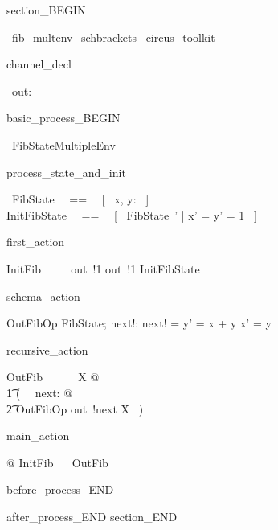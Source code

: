 section_BEGIN
\begin{zsection}
  \SECTION\ fib\_multenv\_schbrackets \parents\ circus\_toolkit
\end{zsection}
channel_decl
\begin{circus}
    \circchannel\ out: \nat
\end{circus}
basic_process_BEGIN
\begin{circus}
    \circprocess\ FibStateMultipleEnv ~~\circdef~~ \circbegin
\end{circus}
process_state_and_init
\begin{circusaction}
    \circstate\ FibState ~~==~~ [~ x, y: \nat ~]  \land [ z: \nat ]\\
    InitFibState ~~==~~ [~ FibState~' | x' = y' = 1 ~]
\end{circusaction}
first_action
\begin{circusaction}
    InitFib ~~\circdef~~ out~!1 \then out~!1 \then \lschexpract InitFibState \rschexpract
\end{circusaction}
schema_action
\begin{schema}{OutFibOp}
    \Delta FibState; next!: \nat
\where
    next! = y' = x + y \land x' = y
\end{schema}
recursive_action
\begin{circusaction}
    OutFib ~~\circdef~~ \circmu\ X @ \\
    	\t1 (~ \circvar\ next: \nat @ \\
	   \t2 \lschexpract OutFibOp \rschexpract \circseq out~!next \then X ~)
\end{circusaction}
main_action
\begin{circusaction}
    @ InitFib ~\circseq~ OutFib
\end{circusaction}
before_process_END
\begin{circus}
    \circend
\end{circus}
after_process_END
section_END 